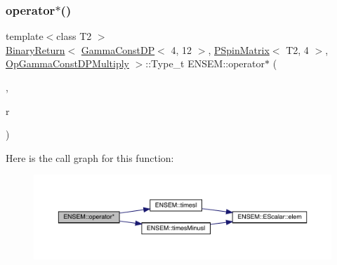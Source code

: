 \subsubsection{\texorpdfstring{operator$\ast$()}{operator*()}\hspace{0.1cm}{\footnotesize\ttfamily [45/64]}}
{\footnotesize\ttfamily template$<$class T2 $>$ \\
\mbox{\hyperlink{structENSEM_1_1BinaryReturn}{Binary\+Return}}$<$ \mbox{\hyperlink{classENSEM_1_1GammaConstDP}{Gamma\+Const\+DP}}$<$ 4, 12 $>$, \mbox{\hyperlink{classENSEM_1_1PSpinMatrix}{P\+Spin\+Matrix}}$<$ T2, 4 $>$, \mbox{\hyperlink{structENSEM_1_1OpGammaConstDPMultiply}{Op\+Gamma\+Const\+D\+P\+Multiply}} $>$\+::Type\+\_\+t E\+N\+S\+E\+M\+::operator$\ast$ (\begin{DoxyParamCaption}\item[{const \mbox{\hyperlink{classENSEM_1_1GammaConstDP}{Gamma\+Const\+DP}}$<$ 4, 12 $>$ \&}]{,  }\item[{const \mbox{\hyperlink{classENSEM_1_1PSpinMatrix}{P\+Spin\+Matrix}}$<$ T2, 4 $>$ \&}]{r }\end{DoxyParamCaption})\hspace{0.3cm}{\ttfamily [inline]}}

Here is the call graph for this function\+:\nopagebreak
\begin{figure}[H]
\begin{center}
\leavevmode
\includegraphics[width=350pt]{d6/df5/group__primspinmatrix_gac9db04966aafec7cc5029c5dc0e37d4d_cgraph}
\end{center}
\end{figure}
\mbox{\label{group__primspinmatrix_ga6ecc3bf3d92d81202c48dce547f7027f}} 
